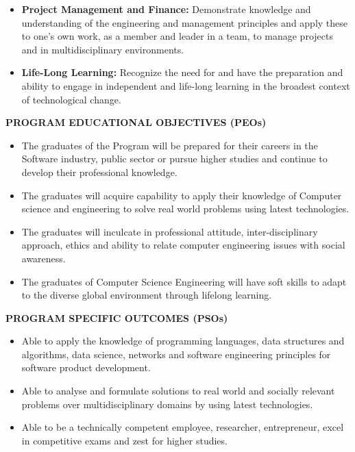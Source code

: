 \documentclass[12pt,a4paper]{report}
\begin{document}
\begin{itemize}[leftmargin=1.5cm, label=PO\arabic*:]
    \item \textbf{Project Management and Finance:} Demonstrate knowledge and understanding of the engineering and management principles and apply these to one's own work, as a member and leader in a team, to manage projects and in multidisciplinary environments.
    \item \textbf{Life-Long Learning:} Recognize the need for and have the preparation and ability to engage in independent and life-long learning in the broadest context of technological change.
\end{itemize}

\newpage
\noindent
\textbf{PROGRAM EDUCATIONAL OBJECTIVES (PEOs)}
\begin{itemize}[leftmargin=1.2cm, label=PEO\arabic*:]
    \item The graduates of the Program will be prepared for their careers in the Software industry, public sector or pursue higher studies and continue to develop their professional knowledge.
    \item The graduates will acquire capability to apply their knowledge of Computer science and engineering to solve real world problems using latest technologies.
    \item The graduates will inculcate in professional attitude, inter-disciplinary approach, ethics and ability to relate computer engineering issues with social awareness.
    \item The graduates of Computer Science Engineering will have soft skills to adapt to the diverse global environment through lifelong learning.
\end{itemize}

\vspace{1cm}
\noindent
\textbf{PROGRAM SPECIFIC OUTCOMES (PSOs)}
\begin{itemize}[leftmargin=1.2cm, label=PSO\arabic*:]
    \item Able to apply the knowledge of programming languages, data structures and algorithms, data science, networks and software engineering principles for software product development.
    \item Able to analyse and formulate solutions to real world and socially relevant problems over multidisciplinary domains by using latest technologies.
    \item Able to be a technically competent employee, researcher, entrepreneur, excel in competitive exams and zest for higher studies.
\end{itemize}
\end{document}

